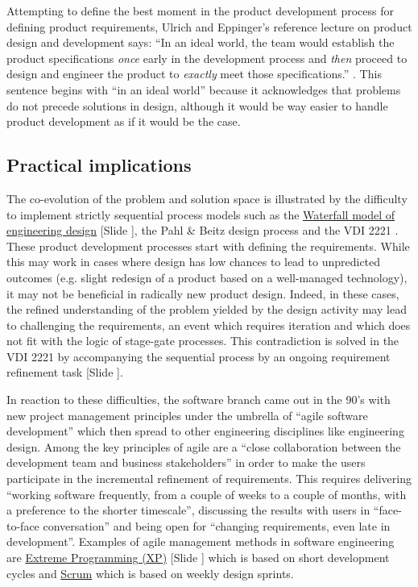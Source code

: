 \documentclass{article}
\newcounter{slide}
\begin{document}
Attempting to define the best moment in the product development process for defining product requirements, Ulrich and Eppinger's reference lecture on product design and development says: ``In an ideal world, the team would establish the product specifications \emph{once} early in the development process and \emph{then} proceed to design and engineer the product to \emph{exactly} meet those specifications.'' \cite[p. 73, emphases are not in the original text]{ulrichProductDesignDevelopment2011}. This sentence begins with ``in an ideal world'' because it acknowledges that problems do not precede solutions in design, although it would be way easier to handle product development as if it would be the case. 

\subsection{Practical implications}
\label{sec:practicalimplicationstwo}

The co-evolution of the problem and solution space is illustrated by the difficulty to implement strictly sequential process models such as the \href{https://en.wikipedia.org/wiki/Waterfall\_model}{Waterfall model of engineering design} {\color{blue}[Slide ]}, the Pahl \& Beitz design process \cite{pahlEngineeringDesignSystematic2007} and the VDI 2221 \cite{vdi1993design}. These product development processes start with defining the requirements. While this may work in cases where design has low chances to lead to unpredicted outcomes (e.g. slight redesign of a product based on a well-managed technology), it may not be beneficial in radically new product design. Indeed, in these cases, the refined understanding of the problem yielded by the design activity may lead to challenging the requirements, an event which requires iteration and which does not fit with the logic of stage-gate processes. This contradiction is solved in the VDI 2221 by accompanying the sequential process by an ongoing requirement refinement task {\color{blue}[Slide ]}\cite{vdi1993design}.

In reaction to these difficulties, the software branch came out in the 90's with new project management principles under the umbrella of ``agile software development'' \cite{beck2001manifesto} which then spread to other engineering disciplines like engineering design. Among the key principles of agile are a ``close collaboration between the development team and business stakeholders'' in order to make the users participate in the incremental refinement of requirements. This requires delivering ``working software frequently, from a couple of weeks to a couple of months, with a preference to the shorter timescale'', discussing the results with users in ``face-to-face conversation'' and being open for ``changing requirements, even late in development''. Examples of agile management methods in software engineering are \href{https://en.wikipedia.org/wiki/Extreme_programming}{Extreme Programming (XP)} {\color{blue}[Slide ]} which is based on short development cycles and \href{https://en.wikipedia.org/wiki/Scrum_(software_development)}{Scrum} which is based on weekly design sprints.
\end{document}
